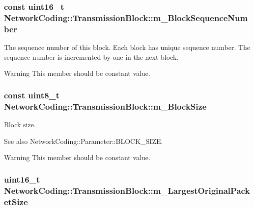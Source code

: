 \subsubsection[{\texorpdfstring{m\+\_\+\+Block\+Sequence\+Number}{m_BlockSequenceNumber}}]{\setlength{\rightskip}{0pt plus 5cm}const uint16\+\_\+t Network\+Coding\+::\+Transmission\+Block\+::m\+\_\+\+Block\+Sequence\+Number}\hypertarget{class_network_coding_1_1_transmission_block_a54d1c096df401da6ca57636c91b3faca}{}\label{class_network_coding_1_1_transmission_block_a54d1c096df401da6ca57636c91b3faca}


The sequence number of this block. Each block has unique sequence number. The sequence number is incremented by one in the next block. 

\begin{DoxyWarning}{Warning}
This member should be constant value. 
\end{DoxyWarning}
\subsubsection[{\texorpdfstring{m\+\_\+\+Block\+Size}{m_BlockSize}}]{\setlength{\rightskip}{0pt plus 5cm}const uint8\+\_\+t Network\+Coding\+::\+Transmission\+Block\+::m\+\_\+\+Block\+Size}\hypertarget{class_network_coding_1_1_transmission_block_a3fac24ea69bc7f68f297d72f0b3e0448}{}\label{class_network_coding_1_1_transmission_block_a3fac24ea69bc7f68f297d72f0b3e0448}


Block size. 

\begin{DoxySeeAlso}{See also}
Network\+Coding\+::\+Parameter\+::\+B\+L\+O\+C\+K\+\_\+\+S\+I\+ZE. 
\end{DoxySeeAlso}
\begin{DoxyWarning}{Warning}
This member should be constant value. 
\end{DoxyWarning}
\subsubsection[{\texorpdfstring{m\+\_\+\+Largest\+Original\+Packet\+Size}{m_LargestOriginalPacketSize}}]{\setlength{\rightskip}{0pt plus 5cm}uint16\+\_\+t Network\+Coding\+::\+Transmission\+Block\+::m\+\_\+\+Largest\+Original\+Packet\+Size}\hypertarget{class_network_coding_1_1_transmission_block_adcc79e6bfd7282430f95268ec86369a7}{}\label{class_network_coding_1_1_transmission_block_adcc79e6bfd7282430f95268ec86369a7}


